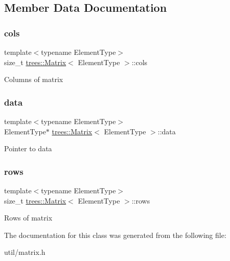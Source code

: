 \subsection{Member Data Documentation}
\mbox{\label{classtrees_1_1_matrix_a612011a0ae81b3e9d0a7e44a7e827f5c}} 
\subsubsection{\texorpdfstring{cols}{cols}}
{\footnotesize\ttfamily template$<$typename Element\+Type$>$ \\
size\+\_\+t \hyperlink{classtrees_1_1_matrix}{trees\+::\+Matrix}$<$ Element\+Type $>$\+::cols}

Columns of matrix \mbox{\label{classtrees_1_1_matrix_ac7cf0dc5123d2df5cfbac43c5b3c3ee6}} 
\subsubsection{\texorpdfstring{data}{data}}
{\footnotesize\ttfamily template$<$typename Element\+Type$>$ \\
Element\+Type$\ast$ \hyperlink{classtrees_1_1_matrix}{trees\+::\+Matrix}$<$ Element\+Type $>$\+::data}

Pointer to data \mbox{\label{classtrees_1_1_matrix_a88dfff3f217f59caec11e519b23153f6}} 
\subsubsection{\texorpdfstring{rows}{rows}}
{\footnotesize\ttfamily template$<$typename Element\+Type$>$ \\
size\+\_\+t \hyperlink{classtrees_1_1_matrix}{trees\+::\+Matrix}$<$ Element\+Type $>$\+::rows}

Rows of matrix 

The documentation for this class was generated from the following file\+:\begin{DoxyCompactItemize}
\item 
util/matrix.\+h\end{DoxyCompactItemize}
